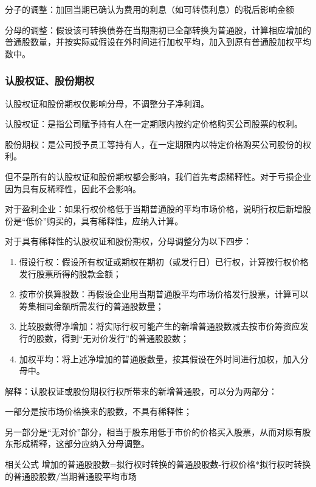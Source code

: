 \documentclass[UTF8,12pt]{ctexart}
\numberwithin{equation}{section} %
\numberwithin{figure}{section}
\numberwithin{table}{section}
\begin{document}
	分子的调整：加回当期已确认为费用的利息（如可转债利息）的税后影响金额
	
	分母的调整：假设该可转换债券在当期期初已全部转换为普通股，计算相应增加的普通股数量，并按实际或假设在外时间进行加权平均，加入到原有普通股加权平均数中。
	
	\subsubsection{认股权证、股份期权}
	认股权证和股份期权仅影响分母，不调整分子净利润。
	
	认股权证：是指公司赋予持有人在一定期限内按约定价格购买公司股票的权利。
	
	股份期权：是公司授予员工等持有人，在一定期限内以特定价格购买公司股份的权利。
	
	但不是所有的认股权证和股份期权都会影响，我们首先考虑稀释性。对于亏损企业因为具有反稀释性，因此不会影响。
	
	对于盈利企业：如果行权价格低于当期普通股的平均市场价格，说明行权后新增股份是“低价”购买的，具有稀释性，应纳入计算。
	
	对于具有稀释性的认股权证和股份期权，分母调整分为以下四步：
	\begin{enumerate}
		\item 假设行权：假设所有权证或期权在期初（或发行日）已行权，计算按行权价格发行股票所得的股款金额；
		
		\item 按市价换算股数：再假设企业用当期普通股平均市场价格发行股票，计算可以筹集相同金额所需发行的普通股数量；
		
		\item 比较股数得净增加：将实际行权可能产生的新增普通股数减去按市价筹资应发行的股数，得到“无对价发行”的普通股股数；
		
		\item 加权平均：将上述净增加的普通股数量，按其假设在外时间进行加权，加入分母中。
	\end{enumerate}
	
	解释：认股权证或股份期权行权所带来的新增普通股，可以分为两部分：
	
	一部分是按市场价格换来的股数，不具有稀释性；
	
	另一部分是“无对价”部分，相当于股东用低于市价的价格买入股票，从而对原有股东形成稀释，这部分应纳入分母调整。

	相关公式
	增加的普通股股数=拟行权时转换的普通股股数-行权价格*拟行权时转换的普通股股数/当期普通股平均市场
	
\end{document}
